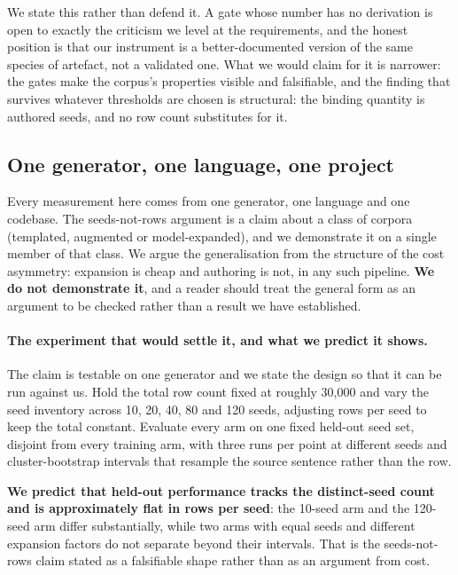 We state this rather than defend it. A gate whose number has no derivation is
open to exactly the criticism we level at the requirements, and the honest
position is that our instrument is a better-documented version of the same
species of artefact, not a validated one. What we would claim for it is narrower:
the gates make the corpus's properties visible and falsifiable, and the finding
that survives whatever thresholds are chosen is structural: the binding
quantity is authored seeds, and no row count substitutes for it.

\subsection{One generator, one language, one project}

Every measurement here comes from one generator, one language and one codebase.
The seeds-not-rows argument is a claim about a class of corpora (templated,
augmented or model-expanded), and we demonstrate it on a single member of that
class. We argue the generalisation from the structure of the cost asymmetry:
expansion is cheap and authoring is not, in any such pipeline. \textbf{We do not
demonstrate it}, and a reader should treat the general form as an argument to be
checked rather than a result we have established.

\paragraph{The experiment that would settle it, and what we predict it shows.}
The claim is testable on one generator and we state the design so that it can be
run against us. Hold the total row count fixed at roughly 30{,}000 and vary the
seed inventory across 10, 20, 40, 80 and 120 seeds, adjusting rows per seed to
keep the total constant. Evaluate every arm on one fixed held-out seed set,
disjoint from every training arm, with three runs per point at different seeds
and cluster-bootstrap intervals that resample the source sentence rather than the
row.

\textbf{We predict that held-out performance tracks the distinct-seed count and
is approximately flat in rows per seed}: the 10-seed arm and the 120-seed arm
differ substantially, while two arms with equal seeds and different expansion
factors do not separate beyond their intervals. That is the seeds-not-rows claim
stated as a falsifiable shape rather than as an argument from cost.

